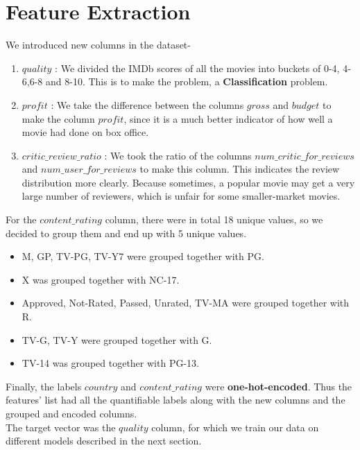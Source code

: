 \documentclass[conference]{IEEEtran}
\begin{document}
\section{Feature Extraction}
We introduced new columns in the dataset-
\begin{enumerate}
	\item $quality$ : We divided the IMDb scores of all the movies into buckets of 0-4, 4-6,6-8 and 8-10. This is to make the problem, a \textbf{Classification} problem.\\
	
	\item $profit$ : We take the difference between the columns $gross$ and $budget$ to make the column $profit$, since it is a much better indicator of how well a movie had done on box office.\\
	
	\item $critic\_review\_ratio$ : We took the ratio of the columns $num\_critic\_for\_reviews$ and $num\_user\_for\_reviews$ to make this column. This indicates the review distribution more clearly. Because sometimes, a popular movie may get a very large number of reviewers, which is unfair for some smaller-market movies.\\
\end{enumerate}
For the $content\_rating$ column, there were in total 18 unique values, so we decided to group them and end up with 5 unique values.
\begin{itemize}
	\item M, GP, TV-PG, TV-Y7 were grouped together with PG.
	\item X was grouped together with NC-17.
	\item Approved, Not-Rated, Passed, Unrated, TV-MA were grouped together with R.
	\item TV-G, TV-Y were grouped together with G.
	\item TV-14 was grouped together with PG-13.\\
\end{itemize}
Finally, the labels $country$ and $content\_rating$ were \textbf{one-hot-encoded}.
Thus the features' list had all the quantifiable labels along with the new columns and the grouped and encoded columns.\\
The target vector was the $quality$ column, for which we train our data on different models described in the next section.\\
\end{document}
